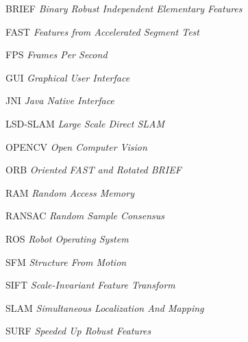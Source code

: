 
\begin{siglas}
\item[BRIEF]\textit{Binary Robust Independent Elementary Features}
\item[FAST]\textit{Features from Accelerated Segment Test}
\item[FPS]\textit{Frames Per Second}
\item[GUI]\textit{Graphical User Interface}
\item[JNI]\textit{Java Native Interface}
\item[LSD-SLAM]\textit{Large Scale Direct SLAM} 
\item[OPENCV]\textit{Open Computer Vision}
\item[ORB]\textit{Oriented FAST and Rotated BRIEF}
\item[RAM]\textit{Random Access Memory}
\item[RANSAC]\textit{Random Sample Consensus}
\item[ROS]\textit{Robot Operating System}
\item[SFM]\textit{Structure From Motion}
\item[SIFT]\textit{Scale-Invariant Feature Transform}
\item[SLAM]\textit{Simultaneous Localization And Mapping}
\item[SURF]\textit{Speeded Up Robust Features}
\end{siglas}
